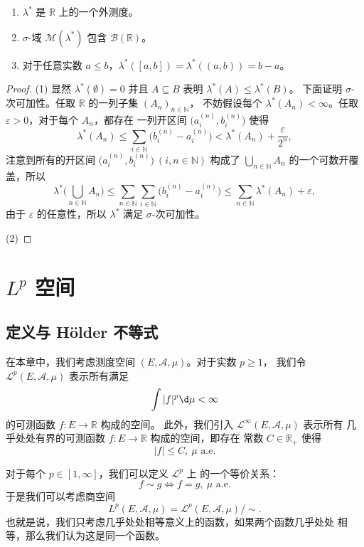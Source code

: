 \documentclass[fontset=none]{Notes}
\newcommand{\alev}[1]{\text{$#1$ a.e.}}
\begin{document}
\begin{theorem}
  \mbox{}
  \begin{enumerate}
    \item $\lambda^*$ 是 $\mathbb{R}$ 上的一个外测度。
    \item $\sigma$-域 $\mathcal{M}(\lambda^*)$ 包含 $\mathcal{B}(\mathbb{R})$。
    \item 对于任意实数 $a\leq b$，$\lambda^*([a,b])=\lambda^*((a,b))=b-a$。
  \end{enumerate}
\end{theorem}
\begin{proof}
  (1) 显然 $\lambda^*(\emptyset)=0$ 并且 $A\subseteq B$ 表明 $\lambda^*(A)\leq\lambda^*(B)$。
  下面证明 $\sigma$-次可加性。任取 $\mathbb{R}$ 的一列子集 $(A_n)_{n\in \mathbb{N}}$，
  不妨假设每个 $\lambda^*(A_n)<\infty$。任取 $\varepsilon>0$，对于每个 $A_n$，都存在
  一列开区间 $\bigl(a_i^{(n)},b_i^{(n)}\bigr)$ 使得
  \[
    \lambda^*(A_n)\leq \sum_{i\in \mathbb{N}}\bigl(b_i^{(n)}-a_i^{(n)}\bigr)
    <\lambda^*(A_n)+\frac{\varepsilon}{2^n},
  \]
  注意到所有的开区间 $\bigl(a_i^{(n)},b_{i}^{(n)}\bigr)\ (i,n\in \mathbb{N})$
  构成了 $\bigcup_{n\in \mathbb{N}}A_n$ 的一个可数开覆盖，所以
  \[
    \lambda^*\biggl(\bigcup_{n\in \mathbb{N}}A_n\biggr)\leq
    \sum_{n\in \mathbb{N}}\sum_{i\in \mathbb{N}}\bigl(b_i^{(n)}-a_i^{(n)}\bigr)
    \leq \sum_{n\in \mathbb{N}}\lambda^*(A_n)+\varepsilon,
  \]
  由于 $\varepsilon$ 的任意性，所以 $\lambda^*$ 满足 $\sigma$-次可加性。

  (2) 
\end{proof}


\chapter{$L^p$ 空间}

\section{定义与 H\"older 不等式}

在本章中，我们考虑测度空间 $(E,\mathcal{A},\mu)$。对于实数 $p\geq 1$，
我们令 $\mathcal{L}^p(E,\mathcal{A},\mu)$ 表示所有满足
\[
  \int |f|^p\d\mu<\infty  
\]
的可测函数 $f:E\to \mathbb{R}$ 构成的空间。
此外，我们引入 $\mathcal{L}^\infty(E,\mathcal{A},\mu)$ 表示所有
几乎处处有界的可测函数 $f:E\to \mathbb{R}$ 构成的空间，即存在
常数 $C\in \mathbb{R}_+$ 使得
\[
  |f|\leq C,\ \alev{\mu}  
\]

对于每个 $p\in [1,\infty]$，我们可以定义 $\mathcal{L}^p$ 上
的一个等价关系：
\[
  f\sim g\Leftrightarrow f=g,\ \alev{\mu}  
\]
于是我们可以考虑商空间
\[
  L^p(E,\mathcal{A},\mu)=\mathcal{L}^p(E,\mathcal{A},\mu)/\sim.  
\]
也就是说，我们只考虑几乎处处相等意义上的函数，如果两个函数几乎处处
相等，那么我们认为这是同一个函数。
\end{document}
